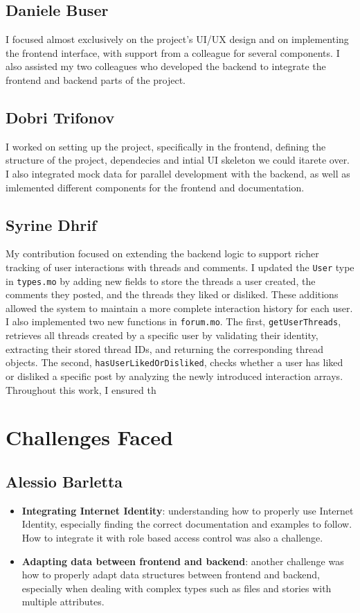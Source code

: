 \documentclass[a4paper]{article}
\begin{document}
	\subsection*{Daniele Buser}
	I focused almost exclusively on the project's UI/UX design and on implementing
	the frontend interface, with support from a colleague for several components. I
	also assisted my two colleagues who developed the backend to integrate the
	frontend and backend parts of the project.
	
	\subsection*{Dobri Trifonov}
	I worked on setting up the project, specifically in the frontend, 
	defining the structure of the project, dependecies and intial UI skeleton we could itarete over.
	I also integrated mock data for parallel development with the backend, as well as imlemented
	different components for the frontend and documentation.
	
	\subsection*{Syrine Dhrif}
	My contribution focused on extending the backend logic to support richer tracking of user interactions with threads and comments. I updated the \texttt{User} type in \texttt{types.mo} by adding new fields to store the threads a user created, the comments they posted, and the threads they liked or disliked. These additions allowed the system to maintain a more complete interaction history for each user. I also implemented two new functions in \texttt{forum.mo}. The first, \texttt{getUserThreads}, retrieves all threads created by a specific user by validating their identity, extracting their stored thread IDs, and returning the corresponding thread objects. The second, \texttt{hasUserLikedOrDisliked}, checks whether a user has liked or disliked a specific post by analyzing the newly introduced interaction arrays. Throughout this work, I ensured th
	
	\section*{Challenges Faced}
	
	\subsection*{Alessio Barletta}
	\begin{itemize}
		\item \textbf{Integrating Internet Identity}: understanding how to properly
		use Internet Identity, especially finding the correct documentation and examples
		to follow. How to integrate it with role based access control was also a
		challenge.
		\item \textbf{Adapting data between frontend and backend}: another challenge
		was how to properly adapt data structures between frontend and backend,
		especially when dealing with complex types such as files and stories with
		multiple attributes.
	\end{itemize}
	
\end{document}
